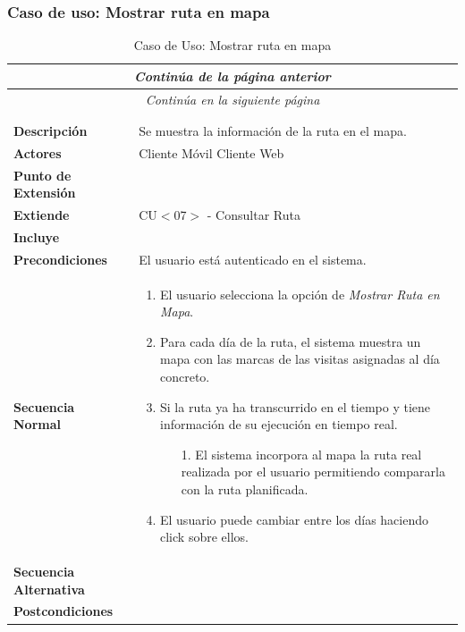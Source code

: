 \subsubsection*{Caso de uso: Mostrar ruta en mapa}
\begin{longtable}{| p{4cm} | p{10cm} |}
\endfirsthead
\multicolumn{2}{c}{\textit{Continúa de la página anterior}}\\[12pt]
\hline
\endhead
\hline
\multicolumn{2}{c}{\textit{Continúa en la siguiente página}} \\
\endfoot
\hline
\caption{Caso de Uso: Mostrar ruta en mapa}\label{fig:1}\\
\endlastfoot


\hline
\multicolumn{2}{|c|}{\textbf{CU$<$10$>$ - Mostrar Ruta en Mapa}} \\

\hline
\textbf{Descripción} &
Se muestra la información de la ruta en el mapa.\\

\hline
\textbf{Actores} &
Cliente Móvil\newline
Cliente Web\\

\hline
\textbf{Punto de Extensión} &
\\

\hline
\textbf{Extiende} &
CU$<$07$>$ - Consultar Ruta
\\

\hline
\textbf{Incluye} &
\\

\hline
\textbf{Precondiciones} &
El usuario está autenticado en el sistema.\\

\hline
\textbf{Secuencia Normal} &\mbox{}\par\vspace{-\baselineskip}
\begin{enumerate}[leftmargin=0.7cm, topsep=0.1cm]
\item El usuario selecciona la opción de \textit{Mostrar Ruta en Mapa}.
\item Para cada día de la ruta, el sistema muestra un mapa con las marcas de las visitas asignadas al día concreto.
\item Si la ruta ya ha transcurrido en el tiempo y tiene información de su ejecución en tiempo real.
	\begin{itemize}
	\item[1.] El sistema incorpora al mapa la ruta real realizada por el usuario permitiendo compararla con la ruta planificada.
	\end{itemize}
\item El usuario puede cambiar entre los días haciendo click sobre ellos.
\end{enumerate}\\

\hline
\textbf{Secuencia Alternativa} &\mbox{}\par\vspace{-\baselineskip}
\\

\hline
\textbf{Postcondiciones} & \\
\hline
\end{longtable}



